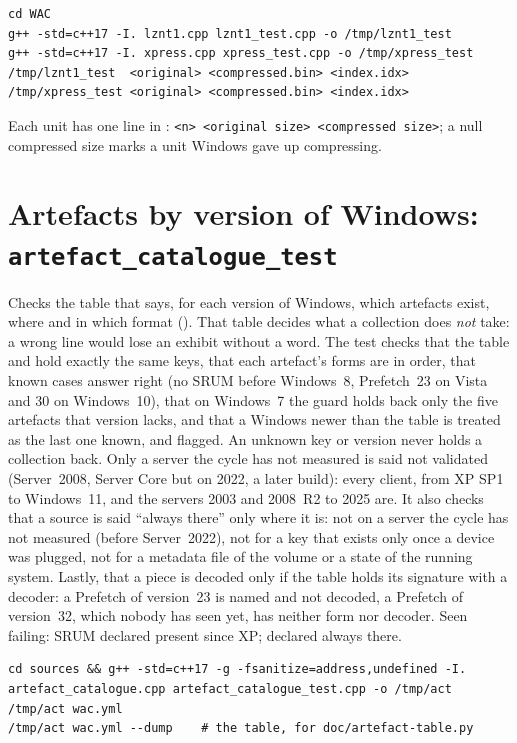 \documentclass[11pt,a4paper,oneside]{report}
\begin{document}
\begin{lstlisting}
cd WAC
g++ -std=c++17 -I. lznt1.cpp lznt1_test.cpp -o /tmp/lznt1_test
g++ -std=c++17 -I. xpress.cpp xpress_test.cpp -o /tmp/xpress_test
/tmp/lznt1_test  <original> <compressed.bin> <index.idx>
/tmp/xpress_test <original> <compressed.bin> <index.idx>
\end{lstlisting}

Each unit has one line in : \texttt{<n> <original size>
<compressed size>}; a null compressed size marks a unit Windows gave up
compressing.

\section{Artefacts by version of Windows: \texttt{artefact\_catalogue\_test}}

Checks the table that says, for each version of Windows, which artefacts
exist, where and in which format (). That table
decides what a collection does \emph{not} take: a wrong line would lose an
exhibit without a word. The test checks that the table and 
hold exactly the same keys, that each artefact's forms are in order, that known
cases answer right (no SRUM before Windows~8, Prefetch~23 on Vista and 30 on
Windows~10), that on Windows~7 the guard holds back only the five artefacts
that version lacks, and that a Windows newer than the table is treated as the
last one known, and flagged. An unknown key or version never holds a collection
back. Only a server the cycle has not measured is said not validated
(Server~2008, Server Core but on 2022, a later build): every client, from XP SP1
to Windows~11, and the servers 2003 and 2008~R2 to 2025 are. It also checks that a source is said ``always there'' only where it is:
not on a server the cycle has not measured (before Server~2022), not for a key that exists only once a device was plugged, not
for a metadata file of the volume or a state of the running system. Lastly,
that a piece is decoded only if the table holds its signature with a decoder: a
Prefetch of version~23 is named and not decoded, a Prefetch of version~32,
which nobody has seen yet, has neither form nor decoder. Seen
failing: SRUM declared present since XP;  declared always
there.

\begin{lstlisting}
cd sources && g++ -std=c++17 -g -fsanitize=address,undefined -I. artefact_catalogue.cpp artefact_catalogue_test.cpp -o /tmp/act
/tmp/act wac.yml
/tmp/act wac.yml --dump    # the table, for doc/artefact-table.py
\end{lstlisting}
\end{document}
